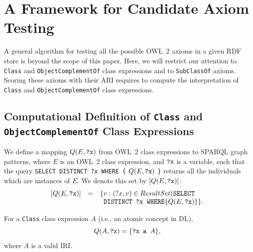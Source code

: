 \documentclass{sig-alternate}
\begin{document}
\section{A Framework for Candidate Axiom Testing}
\label{OWL2SPARQL} 




A general algorithm for testing all the possible OWL~2 axioms in a given RDF store is beyond the scope of this paper. 
Here, we will restrict our attention to \texttt{Class} and \texttt{ObjectComplementOf} class expressions and to \texttt{SubClassOf} axioms. 
Scoring these axioms with their ARI requires to compute the interpretation of \texttt{Class} and \texttt{ObjectComplementOf} class expressions. 
 
\subsection{Computational Definition of \texttt{Class} and \texttt{ObjectComplementOf} Class Expressions}
We define a mapping $Q(E, \mbox{\tt ?x})$ from OWL~2 class expressions to SPARQL graph patterns,
where $E$ is an OWL~2 class expression, and $\mbox{\tt ?x}$ is a variable,
such that the query
\texttt{SELECT DISTINCT ?x WHERE \{} $Q(E, \mbox{\tt ?x})$ \texttt{\}}
returns all the individuals which are instances of $E$. We denote this set by
$[Q(E, \mbox{\tt ?x})]$:
\begin{equation}
  \begin{array}{rcl}
    [Q(E, \mbox{\tt ?x})] &=& \{ v : (?x, v) \in ResultSet(\mbox{\tt SELECT}\\
                          & & \mbox{\tt\ DISTINCT ?x WHERE} \{ Q(E, \mbox{\tt ?x}) \} \}.
  \end{array}
\end{equation} 

For a \texttt{Class} class expression $A$ (i.e., an atomic concept in DL), 
\begin{equation}
Q(A, \mbox{\tt ?x}) = \{\mbox{\tt ?x a }A \},
\end{equation}
where $A$ is a valid IRI.
\end{document}
